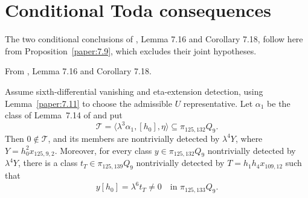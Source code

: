 \section{Conditional Toda consequences}

The two conditional conclusions of \cite{LWX126}, Lemma 7.16 and
Corollary 7.18, follow here from Proposition~\ref{paper:7.9}, which
excludes their joint hypotheses.

\begin{lemma}
\label{paper:7.16}
\label{lem:toda2ext}
\label{paper:7.18}
\label{cor:2ext125}
From \cite{LWX126}, Lemma 7.16 and Corollary 7.18.\par
Assume sixth-differential vanishing and eta-extension detection, using
Lemma~\ref{paper:7.11} to choose the admissible $U$ representative.
Let $\alpha_1$ be the class of Lemma~7.14 of \cite{LWX126} and put
\[
 \mathcal T=\langle\lambda^3\alpha_1,[h_0],\eta\rangle
 \subseteq\pi_{125,132}Q_9.
\]
Then $0\notin\mathcal T$, and its members are nontrivially detected by
$\lambda^4Y$, where $Y=h_0^2x_{125,9,2}$. Moreover, for every class
$y\in\pi_{125,132}Q_9$ nontrivially detected by $\lambda^4Y$, there is
a class $t_T\in\pi_{125,139}Q_9$ nontrivially detected by
$T=h_1h_4x_{109,12}$ such that
\[
 y[h_0]=\lambda^6t_T\ne0\quad\text{in }\pi_{125,133}Q_9.
\]
\end{lemma}

